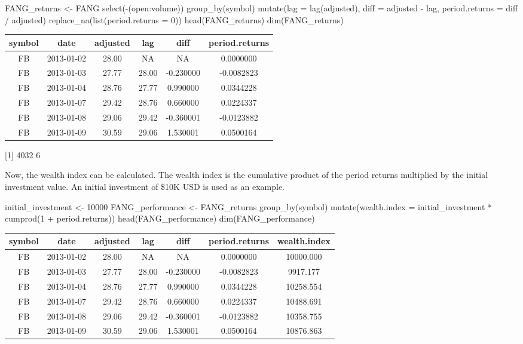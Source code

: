 \begin{Schunk}
\begin{Sinput}
FANG_returns <- FANG %
    select(-(open:volume)) %
    group_by(symbol) %
    mutate(lag = lag(adjusted),
           diff = adjusted - lag,
           period.returns = diff / adjusted) %
    replace_na(list(period.returns = 0)) 
head(FANG_returns)
dim(FANG_returns)
\end{Sinput}
\end{Schunk}

\begin{tabular}{cccccc}
\toprule
symbol & date & adjusted & lag & diff & period.returns\\
\midrule
FB & 2013-01-02 & 28.00 & NA & NA & 0.0000000\\
FB & 2013-01-03 & 27.77 & 28.00 & -0.230000 & -0.0082823\\
FB & 2013-01-04 & 28.76 & 27.77 & 0.990000 & 0.0344228\\
FB & 2013-01-07 & 29.42 & 28.76 & 0.660000 & 0.0224337\\
FB & 2013-01-08 & 29.06 & 29.42 & -0.360001 & -0.0123882\\
FB & 2013-01-09 & 30.59 & 29.06 & 1.530001 & 0.0500164\\
\bottomrule
\end{tabular}

{[}1{]} 4032 6

\hspace{20 mm}

Now, the wealth index can be calculated. The wealth index is the
cumulative product of the period returns multiplied by the initial
investment value. An initial investment of \$10K USD is used as an
example.

\begin{Schunk}
\begin{Sinput}
initial_investment <- 10000
FANG_performance <- FANG_returns %
    group_by(symbol) %
    mutate(wealth.index = initial_investment * cumprod(1 + period.returns)) 
head(FANG_performance)
dim(FANG_performance)
\end{Sinput}
\end{Schunk}

\begin{tabular}{ccccccc}
\toprule
symbol & date & adjusted & lag & diff & period.returns & wealth.index\\
\midrule
FB & 2013-01-02 & 28.00 & NA & NA & 0.0000000 & 10000.000\\
FB & 2013-01-03 & 27.77 & 28.00 & -0.230000 & -0.0082823 & 9917.177\\
FB & 2013-01-04 & 28.76 & 27.77 & 0.990000 & 0.0344228 & 10258.554\\
FB & 2013-01-07 & 29.42 & 28.76 & 0.660000 & 0.0224337 & 10488.691\\
FB & 2013-01-08 & 29.06 & 29.42 & -0.360001 & -0.0123882 & 10358.755\\
FB & 2013-01-09 & 30.59 & 29.06 & 1.530001 & 0.0500164 & 10876.863\\
\bottomrule
\end{tabular}

